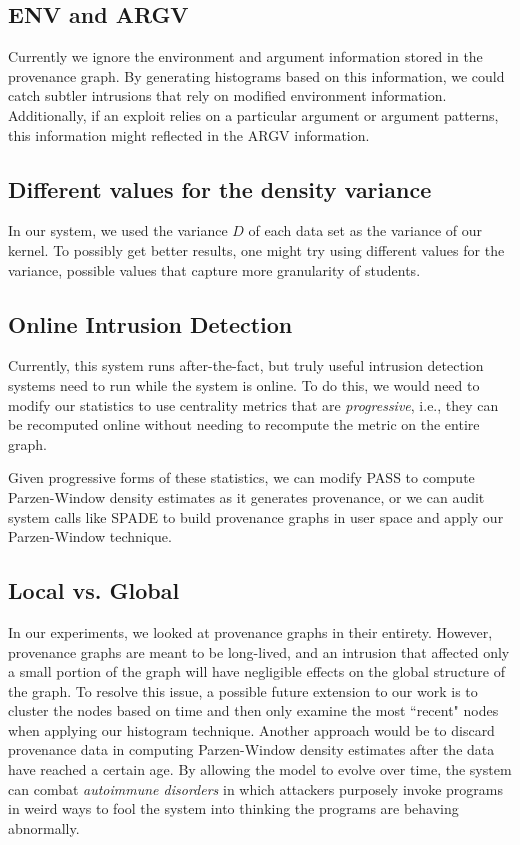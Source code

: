 \documentclass[10pt,twocolumn]{article}
\begin{document}
\subsection{ENV and ARGV}
Currently we ignore the environment and argument information stored in the provenance graph. By generating histograms based on this information, we could catch subtler intrusions that rely on modified environment information. Additionally, if an exploit relies on a particular argument or argument patterns, this information might reflected in the ARGV information.
\subsection{Different values for the density variance}
In our system, we used the variance $D$ of each data set as the variance of our kernel. To possibly get better results, one might try using different values for the variance, possible values that capture more granularity of students.
\subsection{Online Intrusion Detection}
Currently, this system runs after-the-fact, but truly useful intrusion detection systems need to run while the system is online. To do this, we would need to modify our statistics to use centrality metrics that are {\em progressive}, i.e., they can be recomputed online without needing to recompute the metric on the entire graph. 

Given progressive forms of these statistics, we can modify PASS to compute Parzen-Window density estimates as it generates provenance, or we can audit system calls like SPADE \cite{spade} to build provenance graphs in user space and apply our Parzen-Window technique.
\subsection{Local vs. Global}
In our experiments, we looked at provenance graphs in their entirety. However, provenance graphs are meant to be long-lived, and an intrusion that affected only a small portion of the graph will have negligible effects on the global structure of the graph. To resolve this issue, a possible future extension to our work is to cluster the nodes based on time \cite{clustering} and then only examine the most ``recent" nodes when applying our histogram technique. Another approach would be to discard provenance data in computing Parzen-Window density estimates after the data have reached a certain age. By allowing the model to evolve over time, the system
can combat {\em autoimmune disorders} in which attackers purposely invoke programs in weird ways to fool the system into thinking the programs are
behaving abnormally.
\end{document}
